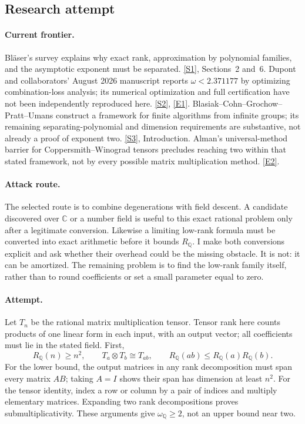 \documentclass[11pt,a4paper]{article}
\newcommand{\Q}{\mathbb{Q}}
\newcommand{\C}{\mathbb{C}}
\newcommand{\sref}[2]{\hyperlink{source:#1:#2}{[S#2]}}
\newcommand{\eref}[2]{\hyperlink{extra:#1:#2}{[E#2]}}
\numberwithin{equation}{section}
\begin{document}
\subsection{Research attempt}

\paragraph{Current frontier.}
Bl\"aser's survey explains why exact rank, approximation by polynomial
families, and the asymptotic exponent must be separated. \sref{26}{1},
Sections~2 and~6. Dupont and collaborators' August 2026 manuscript reports
$\omega<2.371177$ by optimizing combination-loss analysis; its numerical
optimization and full certification have not been independently reproduced
here. \sref{26}{2}, \eref{26}{1}. Blasiak--Cohn--Grochow--Pratt--Umans
construct a framework for finite algorithms from infinite groups; its
remaining separating-polynomial and dimension requirements are substantive,
not already a proof of exponent two. \sref{26}{3}, Introduction.
Alman's universal-method barrier for Coppersmith--Winograd tensors
precludes reaching two within that stated framework, not by every possible
matrix multiplication method. \eref{26}{2}.

\paragraph{Attack route.}
The selected route is to combine degenerations with field descent. A
candidate discovered over $\C$ or a number field is useful to this exact
rational problem only after a legitimate conversion. Likewise a limiting
low-rank formula must be converted into exact arithmetic before it bounds
$R_{\Q}$. I make both conversions explicit and ask whether their overhead
could be the missing obstacle. It is not: it can be amortized. The remaining
problem is to find the low-rank family itself, rather than to round
coefficients or set a small parameter equal to zero.

\paragraph{Attempt.}
Let $T_n$ be the rational matrix multiplication tensor. Tensor rank here
counts products of one linear form in each input, with an output vector;
all coefficients must lie in the stated field. First,
\begin{equation}\label{r26:basic}
 R_{\Q}(n)\ge n^2,\qquad T_a\otimes T_b\cong T_{ab},
 \qquad R_{\Q}(ab)\le R_{\Q}(a)R_{\Q}(b).
\end{equation}
For the lower bound, the output matrices in any rank decomposition must
span every matrix $AB$; taking $A=I$ shows their span has dimension at
least $n^2$. For the tensor identity, index a row or column by a pair
of indices and multiply elementary matrices. Expanding two rank
decompositions proves submultiplicativity. These arguments give
$\omega_{\Q}\ge2$, not an upper bound near two.
\end{document}
